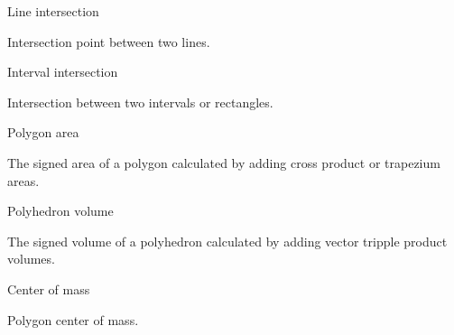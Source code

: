 \begin{algorithm}{Line intersection}

Intersection point between two lines.
\end{algorithm}

\begin{algorithm}{Interval intersection}

Intersection between two intervals or rectangles.
\end{algorithm}

\begin{algorithm}{Polygon area}

The signed area of a polygon calculated by adding cross product or
trapezium areas.
\end{algorithm}

\begin{algorithm}{Polyhedron volume}

The signed volume of a polyhedron calculated by adding vector tripple
product volumes.
\end{algorithm}

\begin{algorithm}{Center of mass}

Polygon center of mass.
\end{algorithm}
